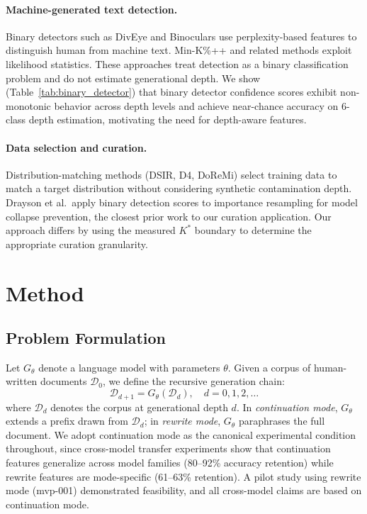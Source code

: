 \documentclass[11pt]{article}
\begin{document}
\paragraph{Machine-generated text detection.}
Binary detectors such as DivEye and Binoculars use perplexity-based features to distinguish human from machine text. Min-K\%++ and related methods exploit likelihood statistics. These approaches treat detection as a binary classification problem and do not estimate generational depth. We show (Table~\ref{tab:binary_detector}) that binary detector confidence scores exhibit non-monotonic behavior across depth levels and achieve near-chance accuracy on 6-class depth estimation, motivating the need for depth-aware features.

\paragraph{Data selection and curation.}
Distribution-matching methods (DSIR, D4, DoReMi) select training data to match a target distribution without considering synthetic contamination depth. Drayson et al.\ apply binary detection scores to importance resampling for model collapse prevention, the closest prior work to our curation application. Our approach differs by using the measured $K^*$ boundary to determine the appropriate curation granularity.

\section{Method}
\label{sec:method}

\subsection{Problem Formulation}

Let $G_\theta$ denote a language model with parameters $\theta$. Given a corpus of human-written documents $\mathcal{D}_0$, we define the recursive generation chain:
\begin{equation}
\mathcal{D}_{d+1} = G_\theta(\mathcal{D}_d), \quad d = 0, 1, 2, \ldots
\end{equation}
where $\mathcal{D}_d$ denotes the corpus at generational depth $d$. In \emph{continuation mode}, $G_\theta$ extends a prefix drawn from $\mathcal{D}_d$; in \emph{rewrite mode}, $G_\theta$ paraphrases the full document. We adopt continuation mode as the canonical experimental condition throughout, since cross-model transfer experiments show that continuation features generalize across model families (80--92\% accuracy retention) while rewrite features are mode-specific (61--63\% retention). A pilot study using rewrite mode (mvp-001) demonstrated feasibility, and all cross-model claims are based on continuation mode.
\end{document}
